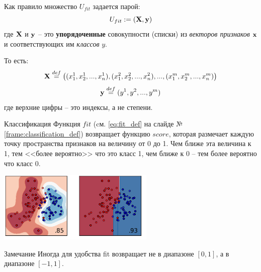 \documentclass{beamer}
\newcommand{\term}{\textit}
\begin{document}
	\begin{frame}
	Как правило множество $U_{fit}$ задается парой:
	\begin{equation}
		U_{fit} := (\bold X, \bold y) 
	\end{equation}
	где $\bold X$ и $\bold y$ -- это \textbf{упорядоченные} совокупности (списки)
	из \term{векторов признаков} $\bold  x$ и соответствующих им \term{классов} $y$. 
	
	
	То есть:
	\begin{equation}
	\bold X \stackrel{def}{=} \left( 
	(x_1^1, x_2^1, ..., x_n^1),
	(x_1^2, x_2^2, ..., x_n^2),
	... ,
	(x_1^m, x_2^m, ..., x_n^m)
	\right)
	\end{equation}
	\begin{equation}
	\bold y \stackrel{def}{=} (y^1, y^2, ..., y^m) 
	\end{equation}
	где верхние цифры -- это индексы, а не степени.
	\end{frame}


	  
	\begin{frame}{Классификация}
	\small
	Функция $fit$ (cм. \eqref{eq:fit_def} на слайде №\ref{frame:classification_def}) возвращает функцию $score$, которая размечает каждую точку пространства признаков на величину от 0 до 1. Чем ближе эта величина к 1, тем <<более вероятно>> что это класс 1, чем ближе к 0 -- тем более вероятно что класс 0.
	\begin{center}
		\includegraphics[width=7.5cm]{../pic/classification_example.png}\centering
	\end{center}
    \begin{block}{Замечание}
    Иногда для удобства fit возвращает не в диапазоне $[0, 1]$,
    а в диапазоне $[-1, 1]$.
    \end{block}
\end{frame}
\end{document}
